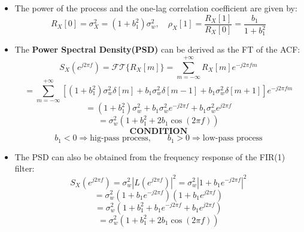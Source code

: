 \begin{itemize}
\[
R_X[m]=\begin{cases}
(1+b_1^2)\sigma_w^2,    & m=0 \\
b_1\sigma_w^2,          & m=\pm1 \\
0,                      & \text{otherwise}
\end{cases}
\]
\item The power of the process and the one-lag correlation coefficient are given by:
\[
R_X[0] = \sigma_X^2 = (1 + b_1^2) \sigma_w^2,
\quad
\rho_X[1] = \frac{R_X[1]}{R_X[0]} = \frac{b_1}{1 + b_1^2}
\]
\item The \textbf{Power Spectral Density(PSD)} can be derived as the FT of the ACF:
\[
S_X(e^{j2\pi f}) = \mathcal{FT}\{R_X[m]\} = \sum_{m=-\infty}^{+\infty} R_X[m] e^{-j2\pi f m}
\]
\[
= \sum_{m=-\infty}^{+\infty} \left[ (1+b_1^2) \sigma_w^2 \delta[m] + b_1 \sigma_w^2 \delta[m-1] + b_1 \sigma_w^2 \delta[m+1] \right] e^{-j2\pi f m}
\]
\[
= (1+b_1^2)\sigma_w^2 + b_1\sigma_w^2 e^{-j2\pi f} + b_1\sigma_w^2 e^{j2\pi f}
\]
\[
= \sigma_w^2 \left(1+b_1^2+2b_1\cos(2\pi f)\right)
\]
\[
\textbf{CONDITION}
\]
\[
b_1<0\Rightarrow\text{hig-pass process,}\qquad b_1>0\Rightarrow\text{low-pass process}
\]
\item The PSD can also be obtained from the frequency response of the FIR(1) filter:
\[
S_X(e^{j2\pi f}) = \sigma_w^2 \left| L(e^{j2\pi f}) \right|^2 = \sigma_w^2 \left| 1 + b_1 e^{-j2\pi f} \right|^2
\]
\[
= \sigma_w^2 \left( 1 + b_1 e^{-j2\pi f} \right) \left( 1 + b_1 e^{j2\pi f} \right)
\]
\[
= \sigma_w^2 \left( 1 + b_1^2 + b_1 e^{-j2\pi f} + b_1 e^{j2\pi f} \right)
\]
\[
= \sigma_w^2 \left( 1 + b_1^2 + 2b_1 \cos(2\pi f) \right)
\]

\end{itemize}



\clearpage